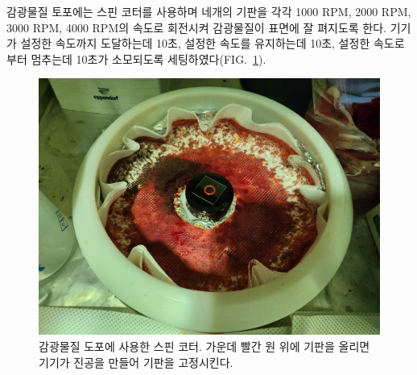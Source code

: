 \documentclass[aps,reprint,superscriptaddress,10pt]{revtex4-2}
\begin{document}
\begin{itemize}
  
  감광물질 토포에는 스핀 코터를 사용하며
  네개의 기판을 각각 1000 RPM, 2000 RPM, 3000 RPM, 4000 RPM의 속도로 회전시켜
  감광물질이 표면에 잘 펴지도록 한다. 기기가 설정한 속도까지 도달하는데 10초,
  설정한 속도를 유지하는데 10초, 설정한 속도로부터 멈추는데 10초가 
  소모되도록 세팅하였다(FIG.~\ref{fig:spin}).
  \begin{figure}[htbp]
    \centering
    \includegraphics[scale=0.04]{spin.JPG}
    \caption{감광물질 도포에 사용한 스핀 코터. 가운데 빨간 원 위에 기판을 올리면
    기기가 진공을 만들어 기판을 고정시킨다.}
    \label{fig:spin}
  \end{figure}


\end{itemize}
\end{document}

